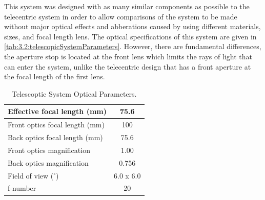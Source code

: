 This system was designed with as many similar components as possible to the telecentric system in order to allow comparisons of the system to be made without major optical effects and abberations caused by using different materials, sizes, and focal length lens. The optical specifications of this system are given in \autoref{tab:3.2:telescopicSystemParameters}. However, there are fundamental differences, the aperture stop is located at the front lens which limits the rays of light that can enter the system, unlike the telecentric design that has a front aperture at the focal length of the first lens.


\begin{table}
    \begin{center}
    \begin{tabular}{|l|c|}
    \hline
    Effective focal length (mm) & 75.6 \\
    \hline
    Front optics focal length (mm) & 100 \\
    \hline
    Back optics focal length (mm) & 75.6 \\
    \hline
    Front optics magnification & 1.00 \\
    \hline
    Back optics magnification & 0.756 \\
    \hline
    Field of view ($^{\circ}$) & 6.0 x 6.0 \\
    \hline
    f-number & 20 \\
    \hline
    \end{tabular}
    \end{center}
    \caption{Telescoptic System Optical Parameters.}
    \label{tab:3.2:telescopicSystemParameters}
\end{table}


